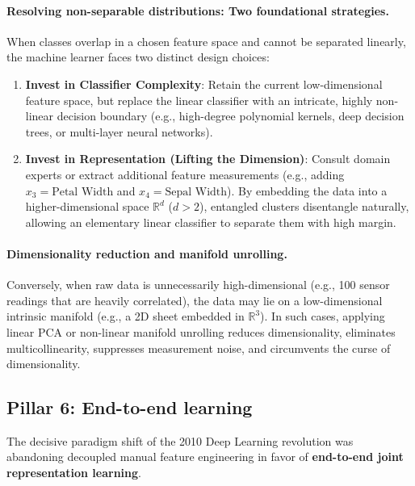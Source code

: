 \paragraph{Resolving non-separable distributions: Two foundational strategies.}
When classes overlap in a chosen feature space and cannot be separated linearly, the machine learner faces two distinct design choices:
\begin{enumerate}
  \item \textbf{Invest in Classifier Complexity}: Retain the current low-dimensional feature space, but replace the linear classifier with an intricate, highly non-linear decision boundary (e.g., high-degree polynomial kernels, deep decision trees, or multi-layer neural networks).
  \item \textbf{Invest in Representation (Lifting the Dimension)}: Consult domain experts or extract additional feature measurements (e.g., adding $x_3 = \text{Petal Width}$ and $x_4 = \text{Sepal Width}$). By embedding the data into a higher-dimensional space $\mathbb{R}^d$ ($d > 2$), entangled clusters disentangle naturally, allowing an elementary linear classifier to separate them with high margin.
\end{enumerate}

\paragraph{Dimensionality reduction and manifold unrolling.}
Conversely, when raw data is unnecessarily high-dimensional (e.g., 100 sensor readings that are heavily correlated), the data may lie on a low-dimensional intrinsic manifold (e.g., a 2D sheet embedded in $\mathbb{R}^3$). In such cases, applying linear PCA or non-linear manifold unrolling reduces dimensionality, eliminates multicollinearity, suppresses measurement noise, and circumvents the curse of dimensionality.

\subsection{Pillar 6: End-to-end learning}
\label{sec:pillar_6_joint_learning}

The decisive paradigm shift of the 2010 Deep Learning revolution was abandoning decoupled manual feature engineering in favor of \textbf{end-to-end joint representation learning}.

